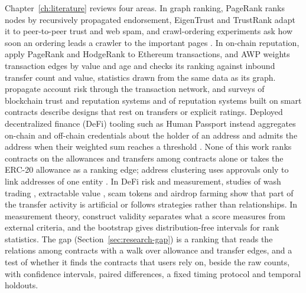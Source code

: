 Chapter~\ref{ch:literature} reviews four areas. In graph ranking, PageRank \parencite{page1999pagerank} ranks nodes by recursively propagated endorsement, EigenTrust \parencite{kamvar2003eigentrust} and TrustRank \parencite{gyongyi2004trustrank} adapt it to peer-to-peer trust and web spam, and crawl-ordering experiments ask how soon an ordering leads a crawler to the important pages \parencite{cho1998crawling}. In on-chain reputation, \textcite{do2023hodgerank} apply PageRank and HodgeRank to Ethereum transactions, and AWP \parencite{do2023awp} weights transaction edges by value and age and checks its ranking against inbound transfer count and value, statistics drawn from the same data as its graph. \textcite{lin2025riskprop} propagate account risk through the transaction network, and surveys of blockchain trust and reputation systems \parencite{bellini2020trust} and of reputation systems built on smart contracts \parencite{almasoud2020reputation} describe designs that rest on transfers or explicit ratings. Deployed decentralized finance (DeFi) tooling such as Human Passport instead aggregates on-chain and off-chain credentials about the holder of an address and admits the address when their weighted sum reaches a threshold \parencite{humanpassportnddocs}. None of this work ranks contracts on the allowances and transfers among contracts alone or takes the ERC-20 allowance \parencite{vogelsteller2015erc20} as a ranking edge; address clustering uses approvals only to link addresses of one entity \parencite{victor2020clustering}. In DeFi risk and measurement, studies of wash trading \parencite{victor2021washtrading}, extractable value \parencite{daian2020flashboys}, scam tokens \parencite{xia2021scamtokens} and airdrop farming \parencite{luo2025airdrop} show that part of the transfer activity is artificial or follows strategies rather than relationships. In measurement theory, construct validity \parencite{cronbach1955construct} separates what a score measures from external criteria, and the bootstrap \parencite{efron1979bootstrap} gives distribution-free intervals for rank statistics. The gap (Section~\ref{sec:research-gap}) is a ranking that reads the relations among contracts with a walk over allowance and transfer edges, and a test of whether it finds the contracts that users rely on, beside the raw counts, with confidence intervals, paired differences, a fixed timing protocol and temporal holdouts.


